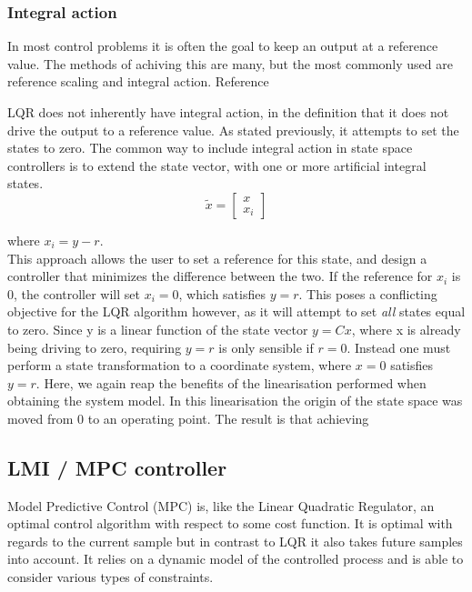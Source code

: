 \subsubsection{Integral action}
In most control problems it is often the goal to keep an output at a reference value. The methods of achiving this are many, but the most commonly used are reference scaling and integral action. Reference

LQR does not inherently have integral action, in the definition that it does not drive the output to a reference value. As stated previously, it attempts to set the states to zero. The common way to include integral action in state space controllers is to extend the state vector, with one or more artificial integral states.
 \begin{equation} \label{eq:ricatti}
 	\tilde{x} = \begin{bmatrix}
 		x \\ x_i
 	\end{bmatrix}
 \end{equation}

where $x_i = y-r$.\\

This approach allows the user to set a reference for this state, and design a controller that minimizes the difference between the two. If the reference for $x_i$ is 0, the controller will set $x_i = 0$, which satisfies $y = r$. This poses a conflicting objective for the LQR algorithm however, as it will attempt to set \textit{all} states equal to zero. Since y is a linear function of the state vector $y = Cx$, where x is already being driving to zero, requiring $y=r$ is only sensible if $r=0$.
Instead one must perform a state transformation to a coordinate system, where $x=0$ satisfies $y=r$. Here, we again reap the benefits of the linearisation performed when obtaining the system model. In this linearisation the origin of the state space was moved from 0 to an operating point. The result is that achieving $$

\subsection{LMI / MPC controller}
Model Predictive Control (MPC) is, like the Linear Quadratic Regulator, an optimal control algorithm with respect to some cost function. It is optimal with regards to the current sample but in contrast to LQR it also takes future samples into account. It relies on a dynamic model of the controlled process and is able to consider various types of constraints.\\

